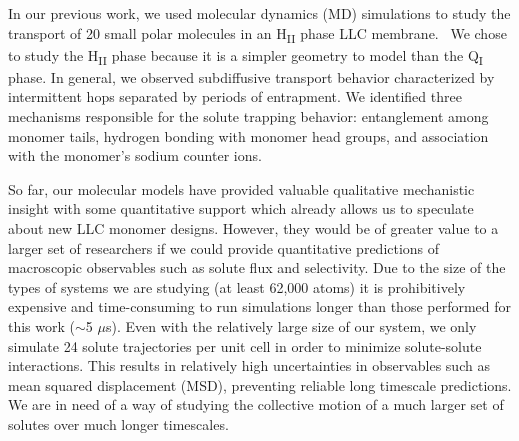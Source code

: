 \documentclass[12pt]{article}
\begin{document}
  In our previous work, we used molecular dynamics (MD) simulations to study the transport
  of 20 small polar molecules in an H\textsubscript{II} phase LLC membrane.~\cite{coscia_chemically_2019}
  We chose to study the H\textsubscript{II} phase because it is a simpler geometry to model than 
  the Q\textsubscript{I} phase.  
  In general, we observed subdiffusive transport behavior characterized by intermittent hops 
  separated by periods of entrapment. We identified three mechanisms responsible for the 
  solute trapping behavior: entanglement among monomer tails, hydrogen bonding with monomer
  head groups, and association with the monomer's sodium counter ions.
  
  So far, our molecular models have provided valuable qualitative mechanistic insight 
  with some quantitative support which already allows us to speculate about new LLC
  monomer designs. However, they would be of greater value to a larger set of 
  researchers if we could provide quantitative predictions of macroscopic observables
  such as solute flux and selectivity. Due to the size of the types of systems we are 
  studying (at least 62,000 atoms) it is prohibitively expensive and time-consuming to
  run simulations longer than those performed for this work ($\sim$5 $\mu$s). 
  Even with the relatively large size of our system, we only simulate 24 solute trajectories per unit cell in order
  to minimize solute-solute interactions. This results in relatively high uncertainties
  in observables such as mean squared displacement (MSD), preventing reliable long
  timescale predictions. We are in need of a way of studying the collective motion
  of a much larger set of solutes over much longer timescales.
  
\end{document}
